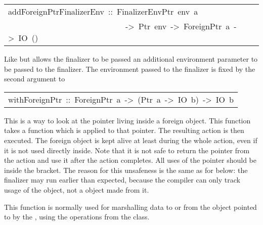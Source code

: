\begin{haddockdesc}
\item[\begin{tabular}{@{}l}
addForeignPtrFinalizerEnv\ ::\ FinalizerEnvPtr\ env\ a\\\ \ \ \ \ \ \ \ \ \ \ \ \ \ \ \ \ \ \ \ \ \ \ \ \ \ \ \ \ ->\ Ptr\ env\ ->\ ForeignPtr\ a\ ->\ IO\ ()
\end{tabular}]\haddockbegindoc
Like  but allows the finalizer to be
 passed an additional environment parameter to be passed to the
 finalizer.  The environment passed to the finalizer is fixed by the
 second argument to 
\par

\end{haddockdesc}
\begin{haddockdesc}
\item[\begin{tabular}{@{}l}
withForeignPtr\ ::\ ForeignPtr\ a\ ->\ (Ptr\ a\ ->\ IO\ b)\ ->\ IO\ b
\end{tabular}]\haddockbegindoc
This is a way to look at the pointer living inside a
 foreign object.  This function takes a function which is
 applied to that pointer. The resulting  action is then
 executed. The foreign object is kept alive at least during
 the whole action, even if it is not used directly
 inside. Note that it is not safe to return the pointer from
 the action and use it after the action completes. All uses
 of the pointer should be inside the
  bracket.  The reason for
 this unsafeness is the same as for
  below: the finalizer
 may run earlier than expected, because the compiler can only
 track usage of the  object, not
 a  object made from it.
\par
This function is normally used for marshalling data to
 or from the object pointed to by the
 , using the operations from the
  class.
\par

\end{haddockdesc}
